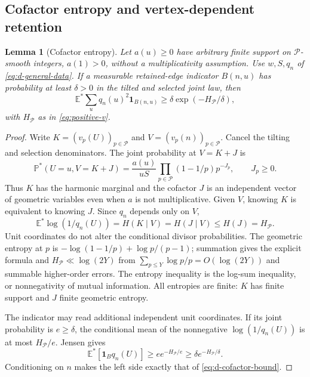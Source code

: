 \documentclass[11pt]{article}
\newtheorem{lemma}[theorem]{Lemma}
\theoremstyle{definition}
\newcommand{\E}{\mathbb E}
\newcommand{\Prob}{\mathbb P}
\newcommand{\ind}{\mathbf 1}
\theoremstyle{remark}
\numberwithin{equation}{section}
\begin{document}
\subsection{Cofactor entropy and vertex-dependent retention}
\begin{lemma}[Cofactor entropy]\label{lem:d-cofactor}
Let $a(u)\ge0$ have arbitrary finite support on $\mathcal P$-smooth integers, $a(1)>0$,
without a multiplicativity assumption. Use $w,S,q_n$ of \eqref{eq:d-general-data}.
If a measurable retained-edge indicator $B(n,u)$ has probability at least $\delta>0$ in the tilted
and selected joint law, then
\begin{equation}\label{eq:d-cofactor-bound}
 \E^*\sum_u q_n(u)^2\ind_{B(n,u)}\ge\delta\exp(-H_{\mathcal P}/\delta),
\end{equation}
with $H_{\mathcal P}$ as in \eqref{eq:positive-v}.
\end{lemma}
\begin{proof}
Write $K=(v_p(U))_{p\in\mathcal P}$ and $V=(v_p(n))_{p\in\mathcal P}$.
Cancel the tilting and selection denominators. The joint probability at $V=K+J$ is
\begin{equation}\label{eq:d-cofactor-law}
 \Prob^*(U=u,V=K+J)=\frac{a(u)}{uS}
 \prod_{p\in\mathcal P}(1-1/p)p^{-J_p},\qquad J_p\ge0.
\end{equation}
Thus $K$ has the harmonic marginal and the cofactor $J$ is an independent vector of geometric
variables even when $a$ is not multiplicative. Given $V$, knowing $K$ is equivalent to knowing $J$.
Since $q_n$ depends only on $V$,
\begin{equation}\label{eq:d-cofactor-entropy}
 \E^*\log(1/q_n(U))=H(K\mid V)=H(J\mid V)\le H(J)=H_{\mathcal P}.
\end{equation}
Unit coordinates do not alter the conditional divisor probabilities. The geometric entropy at $p$ is
$-\log(1-1/p)+\log p/(p-1)$; summation gives the explicit formula and
$H_{\mathcal P}\ll\log(2Y)$ from $\sum_{p\le Y}\log p/p=O(\log(2Y))$ and summable higher-order errors.
The entropy inequality is the log-sum inequality, or nonnegativity of mutual information.
All entropies are finite: $K$ has finite support and $J$ finite geometric entropy.

The indicator may read additional independent unit coordinates. If its joint probability is
$e\ge\delta$, the conditional mean of the nonnegative $\log(1/q_n(U))$ is at most $H_{\mathcal P}/e$.
Jensen gives
\begin{equation}\label{eq:d-cofactor-jensen}
 \E^*[\ind_Bq_n(U)]\ge e e^{-H_{\mathcal P}/e}\ge\delta e^{-H_{\mathcal P}/\delta}.
\end{equation}
Conditioning on $n$ makes the left side exactly that of \eqref{eq:d-cofactor-bound}.
\end{proof}
\end{document}
